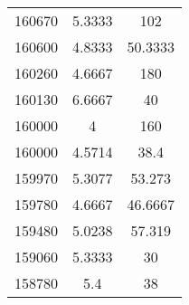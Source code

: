 \begin{table}[htbp]
\begin{tabular}{ccc}
160670 & 5.3333 & 102     \\
160600 & 4.8333 & 50.3333 \\
160260 & 4.6667 & 180     \\
160130 & 6.6667 & 40      \\
160000 & 4      & 160     \\
160000 & 4.5714 & 38.4    \\
159970 & 5.3077 & 53.273  \\
159780 & 4.6667 & 46.6667 \\
159480 & 5.0238 & 57.319  \\
159060 & 5.3333 & 30      \\
158780 & 5.4    & 38      \\
    \hline
  \end{tabular}
\end{table}